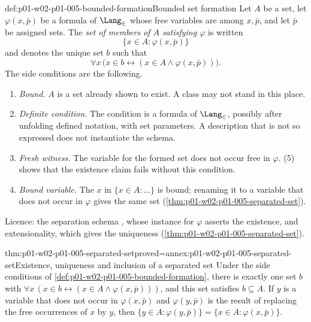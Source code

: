\begin{hbdefinition}{def:p01-w02-p01-005-bounded-formation}{Bounded set formation}
Let \(A\) be a set, let \(\varphi(x,\bar p)\) be a formula of \(\Lang_{\in}\)
whose free variables are among \(x,\bar p\), and let \(\bar p\) be assigned
sets. The \emph{set of members of \(A\) satisfying \(\varphi\)} is written
\[
  \{x\in A:\varphi(x,\bar p)\}
\]
and denotes the unique set \(b\) such that
\[
  \forall x\,\bigl(x\in b\leftrightarrow(x\in A\land\varphi(x,\bar p))\bigr).
\]
The side conditions are the following.
\begin{enumerate}
  \item \emph{Bound.} \(A\) is a set already shown to exist. A class may not
        stand in this place.
  \item \emph{Definite condition.} The condition is a formula of
        \(\Lang_{\in}\), possibly after unfolding defined notation, with set
        parameters. A description that is not so expressed does not instantiate
        the schema.
  \item \emph{Fresh witness.} The variable for the formed set does not occur
        free in \(\varphi\). (5)
        shows that the existence claim fails without this condition.
  \item \emph{Bound variable.} The \(x\) in \(\{x\in A:\dots\}\) is bound;
        renaming it to a variable that does not occur in \(\varphi\) gives the
        same set (\cref{thm:p01-w02-p01-005-separated-set}).
\end{enumerate}
Licence: the separation schema \cite[ch.~``The Axioms of ZF and ZFC'',
definition ``Separation schema'']{FrozenFormalLogicSetOperations}, whose
instance for \(\varphi\) asserts the existence, and extensionality, which
gives the uniqueness (\cref{thm:p01-w02-p01-005-separated-set}).
\end{hbdefinition}

\begin{hblemma}{thm:p01-w02-p01-005-separated-set}{proved=annex:p01-w02-p01-005-separated-set}{Existence, uniqueness and inclusion of a separated set}
Under the side conditions of \cref{def:p01-w02-p01-005-bounded-formation},
there is exactly one set \(b\) with
\(\forall x\,(x\in b\leftrightarrow(x\in A\land\varphi(x,\bar p)))\), and this
set satisfies \(b\subseteq A\). If \(y\) is a variable that does not occur in
\(\varphi(x,\bar p)\) and \(\varphi(y,\bar p)\) is the result of replacing the
free occurrences of \(x\) by \(y\), then
\(\{y\in A:\varphi(y,\bar p)\}=\{x\in A:\varphi(x,\bar p)\}\).
\end{hblemma}

